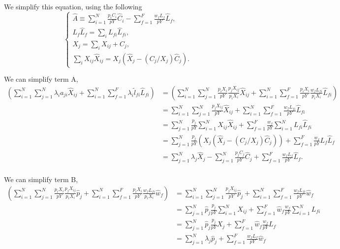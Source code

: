 \documentclass[11pt]{article}
\begin{document}
We simplify this equation, using the following
\begin{equation}
    \begin{cases}
\hat{A} \equiv \sum_{i=1}^N \frac{p_iC_i}{pY} \hat{C}_i - \sum_{f=1}^F \frac{w_f L_f}{pY} \hat{L}_f,\\
 L_f \hat{L}_f = \sum_i  L_{fi} \hat{L}_{fi},\\
    X_j=\sum_i X_{ij} + C_j,\\
    \sum_i X_{ij}\hat{X}_{ij} = X_j (\hat{X}_j - (C_j/X_j) \hat{C}_j).
    \end{cases}
\end{equation}



We can simplify term A,
\begin{align*}
\left(
      \sum_{i=1}^N \sum_{j=1}^N \lambda_i a_{ji} \hat{X}_{ij} + \sum_{i=1}^N\sum_{f=1}^F  \lambda_i\tilde{l}_{fi}\hat{L}_{fi}
      \right)&=\left(
      \sum_{i=1}^N \sum_{j=1}^N \frac{p_iX_i}{pY} \frac{p_jX_{ij}}{p_iX_i} \hat{X}_{ij} + \sum_{i=1}^N\sum_{f=1}^F  \frac{p_iX_i}{pY} \frac{w_fL_{fi}}{p_iX_i}\hat{L}_{fi}
      \right)\\
      &=
     \sum_{i=1}^N \sum_{j=1}^N \frac{p_jX_{ij}}{pY} \hat{X}_{ij} + \sum_{i=1}^N\sum_{f=1}^F  \frac{w_fL_{fi}}{pY}\hat{L}_{fi}\\
     &=
      \sum_{j=1}^N\frac{p_j}{pY}\sum_{i=1}^N   X_{ij}\hat{X}_{ij} +\sum_{f=1}^F  \frac{w_f}{pY}  \sum_{i=1}^N L_{fi}\hat{L}_{fi}\\
      &=
      \sum_{j=1}^N\frac{p_j}{pY}\left(X_j (\hat{X}_j - (C_j/X_j) \hat{C}_j)\right) +\sum_{f=1}^F  \frac{w_f}{pY}   L_f \hat{L}_f\\
      &=
      \sum_{j=1}^N\lambda_j\hat{X}_j - \sum_{j=1}^N\frac{p_jC_j}{pY}  \hat{C}_j +\sum_{f=1}^F  \frac{w_f L_f }{pY}  \hat{L}_f.\\
\end{align*}


We can simplify term B,
\begin{align*} 
    \left(
      \sum_{i=1}^N \sum_{j=1}^N  \frac{p_iX_i}{pY} \frac{p_jX_{ij}}{p_iX_i} \hat{p}_j+\sum_{i=1}^N \sum_{f=1}^F  \frac{p_iX_i}{pY} \frac{w_fL_{fi}}{p_iX_i} \hat{w}_f
      \right)
      &=\sum_{i=1}^N \sum_{j=1}^N   \frac{p_jX_{ij}}{pY} \hat{p}_j+\sum_{i=1}^N \sum_{f=1}^F \frac{w_fL_{fi}}{pY} \hat{w}_f\\
      &=
       \sum_{j=1}^N\hat{p}_j \frac{p_j}{pY}\sum_{i=1}^N   X_{ij} + \sum_{f=1}^F \hat{w}_f\frac{w_f}{pY}\sum_{i=1}^N L_{fi} \\
       &=
       \sum_{j=1}^N\hat{p}_j \frac{p_j}{pY}X_{j} + \sum_{f=1}^F \hat{w}_f\frac{w_f}{pY}L_{f} \\
        &=
       \sum_{j=1}^N\lambda_j \hat{p}_j + \sum_{f=1}^F \frac{w_fL_{f}}{pY}\hat{w}_f \\
\end{align*}
\end{document}
